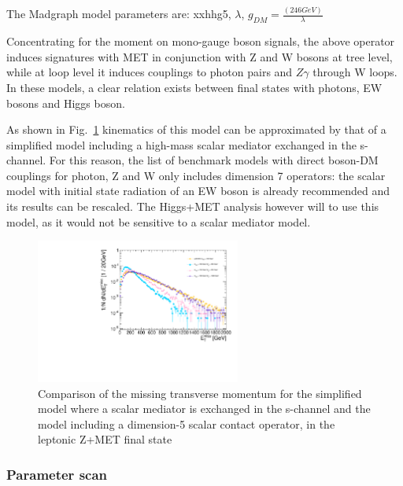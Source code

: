 The Madgraph model parameters are:
xxhhg5, $\lambda$, $g_{DM} = \frac{(246 GeV)}{\lambda}$	

Concentrating  for the moment on mono-gauge boson signals, the above operator induces signatures with 
MET in conjunction with Z and W bosons at tree level,
while at loop level it induces couplings to photon pairs and $Z \gamma$ through W loops.
In these models, a clear relation exists between final states with photons, EW bosons
and Higgs boson. 

As shown in Fig.~\ref{fig:EW_EFT5_Zlep_MET}
kinematics of this model can be approximated by that of a simplified model including 
a high-mass scalar mediator exchanged in the s-channel. For this reason, 
the list of benchmark models with direct boson-DM couplings for photon, Z and W 
only includes dimension 7 operators: the scalar model with initial state radiation of an EW boson
is already recommended and its results can be rescaled. The Higgs+MET analysis
however will to use this model, as it would not be sensitive to a scalar mediator model. 

\begin{figure}
	\includegraphics[width=0.6\textwidth]{figures/EW/pt_vv2_xxDHDH_vs_ScalarMediator.pdf}
	\caption{Comparison of the missing transverse momentum for the simplified model
		where a scalar mediator is exchanged in the s-channel and the model including 
		a dimension-5 scalar contact operator, in the leptonic Z+MET final state}
	\label{fig:EW_EFT5_Zlep_MET}
\end{figure}

\subsubsection{Parameter scan}

